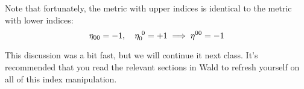 Note that fortunately, the metric with upper indices is identical to the metric with lower indices:
\begin{equation}
    \eta_{00} = -1, \quad \eta_0^{\sp 0} = +1 \implies \eta^{00} = -1
\end{equation}

This discussion was a bit fast, but we will continue it next class. It's recommended that you read the relevant sections in Wald to refresh yourself on all of this index manipulation.